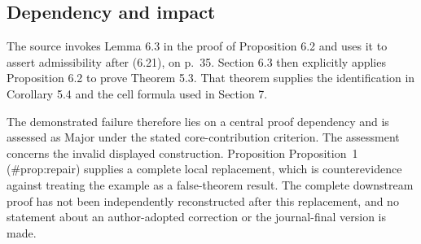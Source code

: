 \documentclass[10pt]{article}
\begin{document}
\subsection*{Dependency and impact}
The source invokes Lemma 6.3 in the proof of Proposition 6.2 and uses it to assert admissibility after (6.21), on p. 35. Section 6.3 then explicitly applies Proposition 6.2 to prove Theorem 5.3. That theorem supplies the identification in Corollary 5.4 and the cell formula used in Section 7.\par
The demonstrated failure therefore lies on a central proof dependency and is assessed as Major under the stated core-contribution criterion. The assessment concerns the invalid displayed construction. Proposition Proposition 1 (\#prop:repair) supplies a complete local replacement, which is counterevidence against treating the example as a false-theorem result. The complete downstream proof has not been independently reconstructed after this replacement, and no statement about an author-adopted correction or the journal-final version is made.\par
\end{document}
